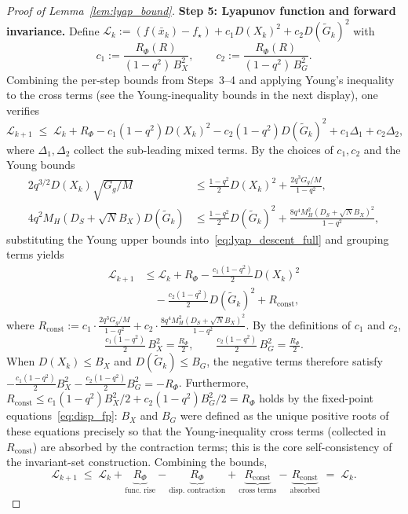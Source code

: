 \documentclass[review,onefignum,onetabnum]{siamart171218}
\begin{document}
\begin{proof}[Proof of Lemma~\ref{lem:lyap_bound}]
		\smallskip
		\noindent\textbf{Step 5: Lyapunov function and forward invariance.}
		Define
		$\mathcal L_k := (f(\bar x_k)-f_\star) + c_1 D(X_k)^2 + c_2 D(\tilde G_k)^2$
		with
		\[
		c_1 := \frac{R_\Phi(R)}{(1-q^2)\,B_X^2},
		\qquad
		c_2 := \frac{R_\Phi(R)}{(1-q^2)\,B_G^2}.
		\]
		Combining the per-step bounds from Steps~3--4 and applying Young's
		inequality to the cross terms (see the Young-inequality bounds in the next display), one verifies
		\begin{equation}\label{eq:lyap_descent_full}
			\mathcal L_{k+1}
			\;\le\;
			\mathcal L_k
			+ R_\Phi
			- c_1(1-q^2)D(X_k)^2
			- c_2(1-q^2)D(\tilde G_k)^2
			+ c_1\Delta_1 + c_2\Delta_2,
		\end{equation}
		where $\Delta_1,\Delta_2$ collect the sub-leading mixed terms.
		By the choices of $c_1,c_2$ and the Young bounds
		\begin{align*}
			2q^{3/2}D(X_k)\sqrt{G_g/M}
			&\le \tfrac{1-q^2}{2}D(X_k)^2 + \tfrac{2q^3 G_g/M}{1-q^2},\\
			4q^2 M_H(D_S{+}\sqrt{N}B_X)D(\tilde G_k)
			&\le \tfrac{1-q^2}{2}D(\tilde G_k)^2
			+ \tfrac{8q^4 M_H^2(D_S{+}\sqrt{N}B_X)^2}{1-q^2},
		\end{align*}
		substituting the Young upper bounds into~\eqref{eq:lyap_descent_full}
		and grouping terms yields
		\begin{align*}
			\mathcal L_{k+1}
			&\le
			\mathcal L_k + R_\Phi
			- \tfrac{c_1(1{-}q^2)}{2}D(X_k)^2\\
			&\quad- \tfrac{c_2(1{-}q^2)}{2}D(\tilde G_k)^2
			+ R_{\mathrm{const}},
		\end{align*}
		where $R_{\mathrm{const}}:=c_1\!\cdot\!\tfrac{2q^3 G_g/M}{1{-}q^2}
		+c_2\!\cdot\!\tfrac{8q^4 M_H^2(D_S{+}\sqrt{N}B_X)^2}{1{-}q^2}$.
		By the definitions of $c_1$ and $c_2$,
		\[
		\tfrac{c_1(1{-}q^2)}{2}\,B_X^2
		= \tfrac{R_\Phi}{2},
		\qquad
		\tfrac{c_2(1{-}q^2)}{2}\,B_G^2
		= \tfrac{R_\Phi}{2}.
		\]
		When $D(X_k)\le B_X$ and $D(\tilde G_k)\le B_G$, the negative terms
		therefore satisfy
		$-\tfrac{c_1(1{-}q^2)}{2}B_X^2-\tfrac{c_2(1{-}q^2)}{2}B_G^2
		=-R_\Phi$.
		Furthermore, $R_{\mathrm{const}}\le c_1(1{-}q^2)B_X^2/2+c_2(1{-}q^2)B_G^2/2=R_\Phi$
		holds by the fixed-point equations~\eqref{eq:disp_fp}:
		$B_X$ and $B_G$ were defined as the unique positive roots of these
		equations precisely so that the Young-inequality cross terms (collected
		in $R_{\mathrm{const}}$) are absorbed by the contraction terms;
		this is the core self-consistency of the invariant-set construction.
		Combining the bounds,
		\[
		\mathcal L_{k+1}
		\;\le\;
		\mathcal L_k
		+\underbrace{R_\Phi}_{\text{func.\ rise}}
		-\underbrace{R_\Phi}_{\text{disp.\ contraction}}
		+\underbrace{R_{\mathrm{const}}}_{\text{cross terms}}
		-\underbrace{R_{\mathrm{const}}}_{\text{absorbed}}
		\;=\; \mathcal L_k.
		\]
		

\end{proof}
\end{document}
